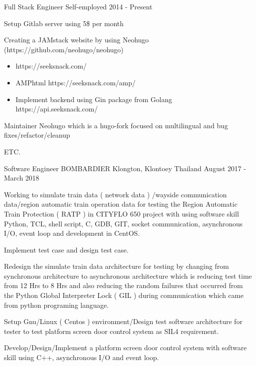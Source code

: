 \begin{cventries}
  \cventry
    {Full Stack Engineer} %
    {Self-employed} %
    {} %
    {2014 - Present} %
    {
      \begin{cvitems} %
        \item {Setup Gitlab server using 5\$ per month}
        \item {Creating a JAMstack website by using Neohugo
              (https://github.com/neohugo/neohugo) }
         \begin{itemize}
           \item https://seeksnack.com/
           \item AMPhtml https://seeksnack.com/amp/
           \item Implement backend using Gin package from Golang
             https://api.seeksnack.com/
         \end{itemize}
        \item {Maintainer Neohugo which is a hugo-fork focused on multilingual and bug
    fixes/refactor/cleanup}
        \item {ETC.}
      \end{cvitems}
    }

  \cventry
    {Software Engineer} %
    {BOMBARDIER} %
    {Klongton, Klontoey Thailand} %
    {August 2017 - March 2018} %
    {
      \begin{cvitems} %
       \item {Working to simulate train data ( network data ) /wayside communication
       data/region automatic train operation data for testing the Region Automatic
               Train Protection ( RATP ) in CITYFLO 650 project with using software
               skill Python, TCL, shell script, C, GDB, GIT, socket communication,
               asynchronous I/O, event loop and development in CentOS.}
       \item {Implement test case and design test case.}
       \item {Redesign the simulate train data architecture for testing by changing
       from synchronous architecture to asynchronous architecture which is reducing test
               time from 12 Hrs to 8 Hrs and also reducing the random failures that
               occurred from the Python Global Interpreter Lock ( GIL ) during
               communication which came from python programing language.}
       \item {Setup Gnu/Linux ( Centos ) environment/Design test software architecture
       for tester to test platform screen door control system as SIL4 requirement.}
       \item {Develop/Design/Implement a platform screen door control system with
  software skill using C++, asynchronous I/O and event loop.}
      \end{cvitems}
    }


\end{cventries}

